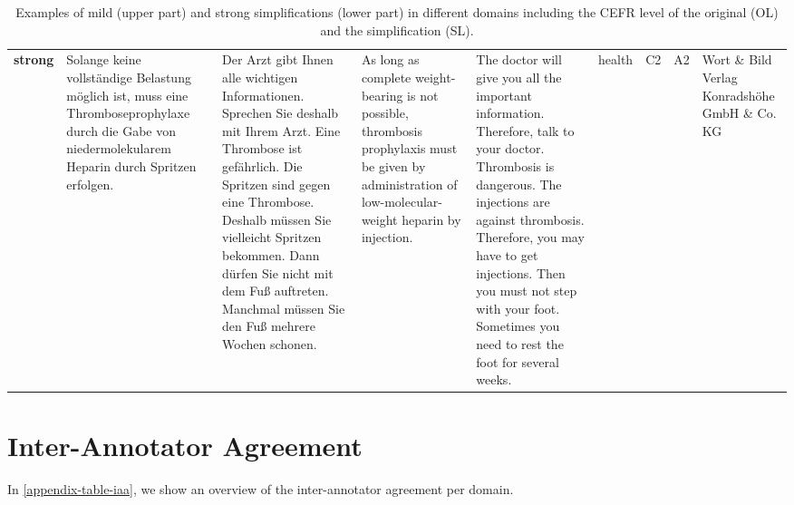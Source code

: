 \documentclass[11pt]{article}
\begin{document}
\begin{table*}[]
{\begin{tabular}{l|p{5cm}p{5cm}p{5cm}p{5cm}lllp{2cm}}
\textbf{strong} & Solange keine vollständige Belastung möglich ist, muss eine Thromboseprophylaxe durch die Gabe von niedermolekularem Heparin durch Spritzen erfolgen. & Der Arzt gibt Ihnen alle wichtigen Informationen. Sprechen Sie deshalb mit Ihrem Arzt. Eine Thrombose ist gefährlich. Die Spritzen sind gegen eine Thrombose. Deshalb müssen Sie vielleicht Spritzen bekommen. Dann dürfen Sie nicht mit dem Fuß auftreten. Manchmal müssen Sie den Fuß mehrere Wochen schonen. & As long as complete weight-bearing is not possible, thrombosis prophylaxis must be given by administration of low-molecular-weight heparin by injection. & The doctor will give you all the important information. Therefore, talk to your doctor. Thrombosis is dangerous. The injections are against thrombosis. Therefore, you may have to get injections. Then you must not step with your foot. Sometimes you need to rest the foot for several weeks. & health & C2 & A2 & Wort \& Bild Verlag Konradshöhe GmbH \& Co. KG
\end{tabular}}
\caption{Examples of mild (upper part) and strong simplifications (lower part) in different domains including the CEFR level of the original (OL) and the simplification (SL).}
\label{tab-app-example-simp}
\end{table*}

\section{Inter-Annotator Agreement}
\label{appendix-tab-iaa}
In \autoref{appendix-table-iaa}, we show an overview of the inter-annotator agreement per domain.

\begin{table}[htb]
\caption{Inter-annotator agreement per domain including average, standard deviation, number of sentence combinations (\# sents), and number of documents (\# docs).}
\label{appendix-table-iaa}
\end{table}
\end{document}
